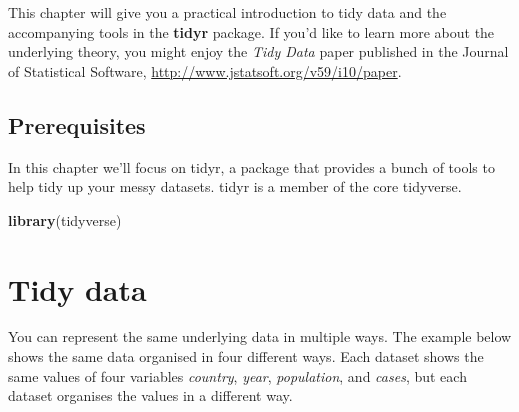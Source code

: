 \documentclass[]{book}
\newenvironment{Shaded}{\begin{snugshade}}{\end{snugshade}}
\newcommand{\KeywordTok}[1]{\textcolor[rgb]{0.13,0.29,0.53}{\textbf{{#1}}}}
\newcommand{\NormalTok}[1]{{#1}}
\begin{document}
This chapter will give you a practical introduction to tidy data and the
accompanying tools in the \textbf{tidyr} package. If you'd like to learn
more about the underlying theory, you might enjoy the \emph{Tidy Data}
paper published in the Journal of Statistical Software,
\url{http://www.jstatsoft.org/v59/i10/paper}.

\subsection{Prerequisites}\label{prerequisites-6}

In this chapter we'll focus on tidyr, a package that provides a bunch of
tools to help tidy up your messy datasets. tidyr is a member of the core
tidyverse.

\begin{Shaded}
\begin{Highlighting}[]
\KeywordTok{library}\NormalTok{(tidyverse)}
\end{Highlighting}
\end{Shaded}

\hypertarget{tidy-data-1}{\section{Tidy data}\label{tidy-data-1}}

You can represent the same underlying data in multiple ways. The example
below shows the same data organised in four different ways. Each dataset
shows the same values of four variables \emph{country}, \emph{year},
\emph{population}, and \emph{cases}, but each dataset organises the
values in a different way.
\end{document}
